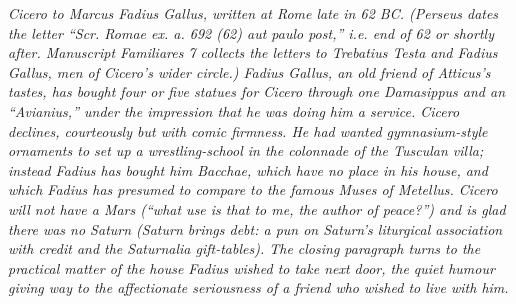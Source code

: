 
\textit{Cicero to Marcus Fadius Gallus, written at Rome
late in 62 BC. (Perseus dates the letter ``Scr. Romae ex.
a. 692 (62) aut paulo post,'' i.e. end of 62 or shortly
after. Manuscript Familiares 7 collects the letters to
Trebatius Testa and Fadius Gallus, men of Cicero's wider
circle.) Fadius Gallus, an old friend of Atticus's tastes,
has bought four or five statues for Cicero through one
Damasippus and an ``Avianius,'' under the impression that
he was doing him a service. Cicero declines, courteously
but with comic firmness. He had wanted gymnasium-style
ornaments to set up a wrestling-school in the colonnade
of the Tusculan villa; instead Fadius has bought him
Bacchae, which have no place in his house, and which
Fadius has presumed to compare to the famous Muses of
Metellus. Cicero will not have a Mars (``what use is
that to me, the author of peace?'') and is glad there
was no Saturn (Saturn brings debt: a pun on Saturn's
liturgical association with credit and the Saturnalia
gift-tables). The closing paragraph turns to the practical
matter of the house Fadius wished to take next door, the
quiet humour giving way to the affectionate seriousness
of a friend who wished to live with him.}
